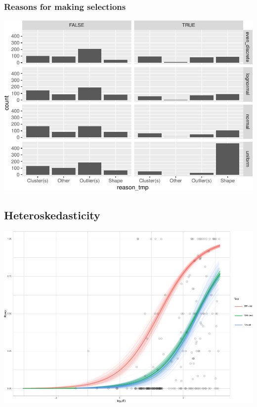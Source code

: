 \documentclass[]{interact}
\theoremstyle{plain}%
\theoremstyle{definition}
\theoremstyle{remark}
\begin{document}
\hypertarget{reasons-for-making-selections}{%
\subsubsection{Reasons for making
selections}\label{reasons-for-making-selections}}

\includegraphics{paper_comparison_files/figure-latex/unnamed-chunk-12-1.pdf}

\hypertarget{heteroskedasticity}{%
\subsection{Heteroskedasticity}\label{heteroskedasticity}}

\includegraphics{paper_comparison_files/figure-latex/unnamed-chunk-15-1.pdf}
\end{document}
